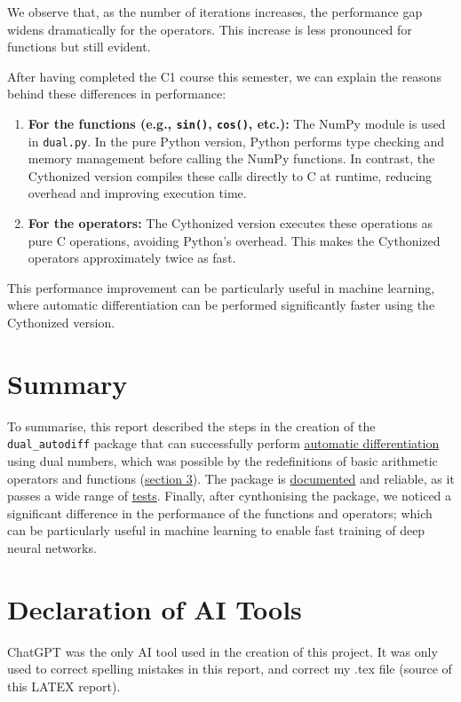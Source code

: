 \documentclass[a4paper,12pt]{article}
\begin{document}
We observe that, as the number of iterations increases, the performance gap widens dramatically for the operators. This increase is less pronounced for functions but still evident.

\vspace{10pt}

After having completed the C1 course this semester, we can explain the reasons behind these differences in performance:
\begin{enumerate}
    \item \textbf{For the functions (e.g., \texttt{sin()}, \texttt{cos()}, etc.):}  
    The NumPy module is used in \texttt{dual.py}. In the pure Python version, Python performs type checking and memory management before calling the NumPy functions. In contrast, the Cythonized version compiles these calls directly to C at runtime, reducing overhead and improving execution time.

    \item \textbf{For the operators:}  
    The Cythonized version executes these operations as pure C operations, avoiding Python's overhead. This makes the Cythonized operators approximately twice as fast.
\end{enumerate}

\vspace{10pt}

This performance improvement can be particularly useful in machine learning, where automatic differentiation can be performed significantly faster using the Cythonized version.


\section{Summary}
To summarise, this report described the steps in the creation of the \texttt{dual\_autodiff} package that can successfully perform  \hyperref[sec:part5]{automatic differentiation} using dual numbers, which was possible by the redefinitions of basic arithmetic operators and functions (\hyperref[sec:part3]{section 3}). The package is \hyperref[sec:documentation]{documented} and reliable, as it passes a wide range of \hyperref[sec:tests]{tests}. Finally, after cynthonising the package, we noticed a significant difference in the performance of the functions and operators; which can be particularly useful in machine learning to enable fast training of deep neural networks.

\section{Declaration of AI Tools}
ChatGPT was the only AI tool used in the creation of this project. It was only used to correct spelling mistakes in this report, and correct my .tex file (source of this LATEX report). 
\end{document}
